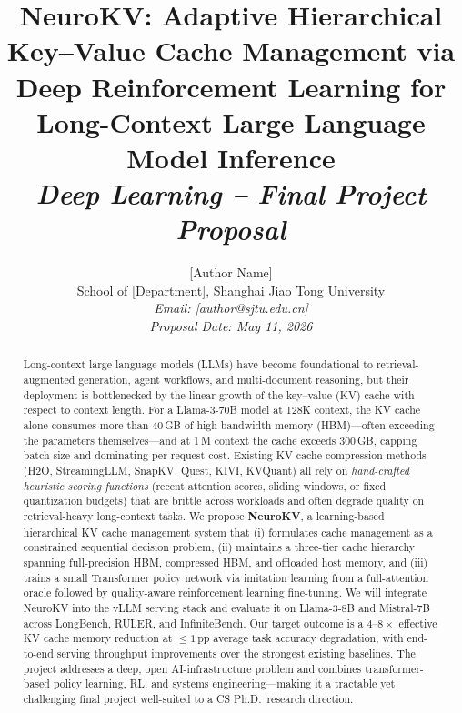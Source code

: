 \documentclass[journal]{IEEEtran}
\begin{document}
\title{NeuroKV: Adaptive Hierarchical Key--Value Cache Management via Deep Reinforcement Learning for Long-Context Large Language Model Inference\\
\large{\textit{Deep Learning -- Final Project Proposal}}}

\author{[Author Name]\\
School of [Department], Shanghai Jiao Tong University\\
\textit{Email: [author@sjtu.edu.cn]} \\
\textit{Proposal Date: May 11, 2026}
}

\maketitle

\begin{abstract}
Long-context large language models (LLMs) have become foundational to retrieval-augmented generation, agent workflows, and multi-document reasoning, but their deployment is bottlenecked by the linear growth of the key--value (KV) cache with respect to context length. For a Llama-3-70B model at 128K context, the KV cache alone consumes more than 40\,GB of high-bandwidth memory (HBM)---often exceeding the parameters themselves---and at 1\,M context the cache exceeds 300\,GB, capping batch size and dominating per-request cost. Existing KV cache compression methods (H2O, StreamingLLM, SnapKV, Quest, KIVI, KVQuant) all rely on \emph{hand-crafted heuristic scoring functions} (recent attention scores, sliding windows, or fixed quantization budgets) that are brittle across workloads and often degrade quality on retrieval-heavy long-context tasks. We propose \textbf{NeuroKV}, a learning-based hierarchical KV cache management system that (i) formulates cache management as a constrained sequential decision problem, (ii) maintains a three-tier cache hierarchy spanning full-precision HBM, compressed HBM, and offloaded host memory, and (iii) trains a small Transformer policy network via imitation learning from a full-attention oracle followed by quality-aware reinforcement learning fine-tuning. We will integrate NeuroKV into the vLLM serving stack and evaluate it on Llama-3-8B and Mistral-7B across LongBench, RULER, and InfiniteBench. Our target outcome is a $4$--$8\times$ effective KV cache memory reduction at $\le 1$\,pp average task accuracy degradation, with end-to-end serving throughput improvements over the strongest existing baselines. The project addresses a deep, open AI-infrastructure problem and combines transformer-based policy learning, RL, and systems engineering---making it a tractable yet challenging final project well-suited to a CS Ph.D.\ research direction.
\end{abstract}
\end{document}

